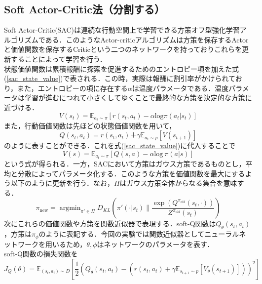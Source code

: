 \documentclass[dvipdfmx]{ampbt_nomag}
\begin{document}
\subsection{Soft Actor-Critic法（分割する）}
Soft Actor-Critic(SAC)\cite{SAC1,SAC2}は連続な行動空間上で学習できる方策オフ型強化学習アルゴリズムである．このようなActor-criticアルゴリズムは方策を保存するActorと価値関数を保存するCriticという二つのネットワークを持っておりこれらを更新することによって学習を行う．\\
状態価値関数は累積報酬に探索を促進するためのエントロピー項を加えた式(\ref{sac_state_value})で表される．この時，実際は報酬に割引率がかけられており，また，エントロピーの項に存在する$\alpha$は温度パラメータである．温度パラメータは学習が進むにつれて小さくしてゆくことで最終的な方策を決定的な方策に近づける．
\begin{equation} \label{sac_state_value}
 V(s_t) = \mathbb{E}_{a_t\sim\pi}\left[r(s_{t},a_{t}) - \alpha \textrm{log}\pi (a_{t}|s_{t}) \right] 
\end{equation}
また，行動価値関数は先ほどの状態価値関数を用いて，
\begin{equation} \label{sac_act_value}
  Q(s_t,a_t) = r(s_{t},a_{t})＋\gamma \mathbb{E}_{a_t\sim p}[V(s_{t+1})]
\end{equation}
のように表すことができる．これを式(\ref{sac_state_value})に代入することで
\begin{equation} \label{sac_v_q}
  V(s) = \mathbb{E}_{a_t\sim\pi} \left[Q(s,a) - \alpha \textrm{log}~\pi (a|s)  \right]
\end{equation}
という式が得られる．一方，SACにおいて方策はガウス方策であるものとし，平均と分散によってパラメータ化する．このような方策を価値関数を最大にするよう以下のように更新を行う．なお，$\Pi$はガウス方策全体からなる集合を意味する．
\begin{equation} \label{sac_policy_iter}
  \pi_{\mathrm{new}} = \mathop{\textrm{argmin}}_{\pi'\in\Pi}D_{KL}\left(\pi'(\cdot|s_t) \| \frac{\exp(Q^{\pi_{old}}(s_t,\cdot))}{Z^{\pi_{old}}(s_t)} \right)
\end{equation}
次にこれらの価値関数や方策を関数近似器で表現する．soft-Q関数は$Q_\theta(s_t,a_t)$，方策は$\pi_\phi$のように表記する．今回の実験では関数近似器としてニューラルネットワークを用いるため，$\theta,\phi$はネットワークのパラメータを表す．\\
soft-Q関数の損失関数を
\begin{equation} \label{sac_value_loss}
  J_Q(\theta) = \mathbb{E}_{(s_t,a_t) \sim D} \left[ \frac{1}{2}\left( Q_\theta(s_t,a_t) - \left( r(s_t,a_t) + \gamma \mathbb{E}_{s_{t+1} \sim p}[V_{\bar{\theta}}(s_{t+1})]\right)\right)^2 \right]
\end{equation}
\end{document}
